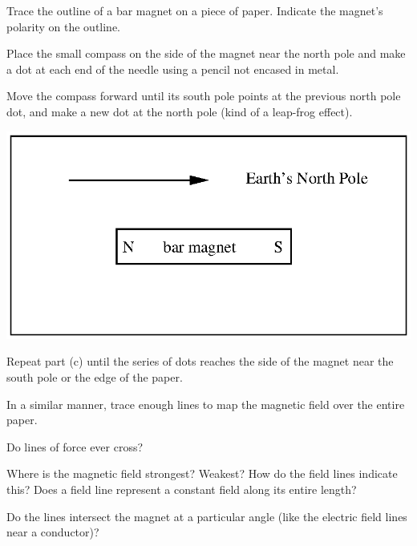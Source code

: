 \begin{enumerate}[labparts]
\begin{minipage}{0.49\textwidth}
\item Trace the outline of a bar magnet on a piece of paper.
 Indicate the magnet's polarity on the outline.
\item Place the small compass on the side of the magnet near the north pole
 and make a dot at each end of the needle using a pencil not encased in metal.
\item Move the compass forward until its south pole points at the previous
north pole dot, and make a new dot at the north pole (kind of a leap-frog 
effect).
\end{minipage}
\begin{minipage}{0.45\textwidth}
\hspace{0.25in}\includegraphics[width=\textwidth]{magnetism_field_perm_mag/magnetism_2_fig_1.eps}
\end{minipage}


\item Repeat part (c) until the series of dots reaches the side of the magnet near 
the south pole or the edge of the paper.
\item In a similar manner, trace enough lines to map the magnetic field
over the entire paper.
\item Do lines of force ever cross?
\answerspace{15mm}

\item Where is the magnetic field strongest? Weakest? How do the field
lines indicate this? Does a field line represent a constant field
along its entire length?
\answerspace{15mm}

\item Do the lines intersect the magnet at a particular angle (like the
electric field lines near a conductor)?
\answerspace{15mm}
\end{enumerate}

